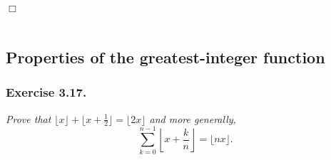 \documentclass{article}
\begin{document}
$\Box$ \\\\









\subsection*{Properties of the greatest-integer function \\}






\subsubsection*{Exercise 3.17.}
\emph{Prove that $\lfloor x \rfloor + \lfloor x+\frac{1}{2} \rfloor = \lfloor 2x \rfloor$
and more generally,}
\[
  \sum_{k=0}^{n-1} \left\lfloor x + \frac{k}{n} \right\rfloor
  = \lfloor nx \rfloor.
\]
\end{document}
